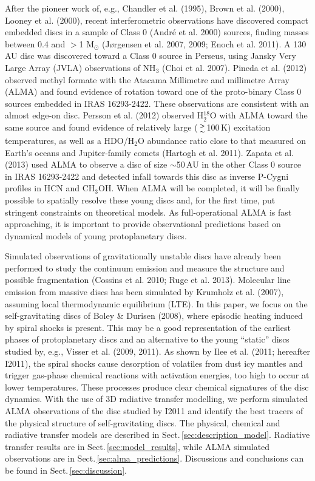 \documentclass[useAMS,usenatbib]{mn2e}
\begin{document}
After the pioneer work of, e.g., Chandler et al. (1995), Brown et al. (2000), Looney et al. (2000), recent interferometric observations have discovered compact embedded discs in a sample of Class 0 (Andr\'e et al. 2000) sources, finding masses between 0.4 and  $>$1 M$_{\odot}$ (J\o rgensen et al. 2007, 2009; Enoch et al. 2011). A 130\,AU disc was discovered toward a Class 0 source in Perseus, using Jansky Very Large Array (JVLA) observations of NH$_3$ (Choi et al. 2007). Pineda et al. (2012) observed methyl formate with the Atacama Millimetre and millimetre Array (ALMA) and found evidence of rotation toward one of the proto-binary Class 0 sources embedded in IRAS 16293-2422. These observations are consistent with an almost edge-on disc. Persson et al. (2012) observed H$_2^{18}$O with ALMA toward the same source and found evidence of relatively large ($\ga$100\,K) excitation temperatures, as well as a HDO/H$_2$O abundance ratio close to that measured on Earth's oceans and Jupiter-family comets (Hartogh et al. 2011). Zapata et al. (2013) used ALMA to observe a disc of size $\sim$50$\,$AU in the other Class 0 source in IRAS 16293-2422 and detected infall towards this disc as inverse P-Cygni profiles in HCN and CH$_3$OH. When ALMA will be completed, it will be finally possible to spatially resolve these young discs and, for the first time, put stringent constraints on theoretical models. As full-operational ALMA is fast approaching, it is important to provide observational predictions based on dynamical models of young protoplanetary discs. \newline 

Simulated observations of gravitationally unstable discs have already been performed to study the continuum emission and measure the structure and possible fragmentation (Cossins et al. 2010; Ruge et al. 2013). Molecular line emission from massive discs has been simulated by Krumholz et al. (2007), assuming local thermodynamic equilibrium (LTE). In this paper, we focus on the self-gravitating discs of Boley \& Durisen (2008), where episodic heating induced by spiral shocks is present. This may be a good representation of the earliest phases of protoplanetary discs and an alternative to the young ``static'' discs studied by, e.g., Visser et al. (2009, 2011). As shown by Ilee et al. (2011; hereafter I2011), the spiral shocks cause desorption of volatiles from dust icy mantles and trigger gas-phase chemical reactions with activation energies, too high to occur at lower temperatures. These processes produce clear chemical signatures of the disc dynamics. With the use of 3D radiative transfer modelling, we perform simulated ALMA observations of the disc studied by I2011 and identify the best tracers of the physical structure of self-gravitating discs. The physical, chemical and radiative transfer models are described in Sect.\,\ref{sec:description_model}. Radiative transfer results are in Sect.\,\ref{sec:model_results}, while ALMA simulated observations are in Sect.\,\ref{sec:alma_predictions}. Discussions and conclusions can be found in Sect.\,\ref{sec:discussion}. 
\end{document}
